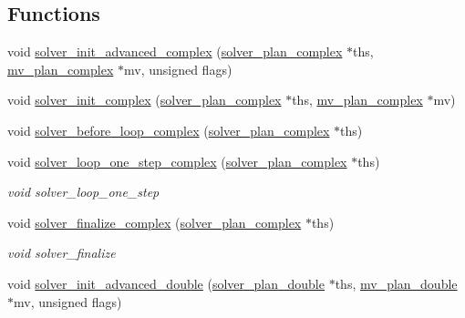 \subsection*{Functions}
\begin{CompactItemize}
\item 
\hypertarget{group__solver_gdc8907c56239059e1d313b9aa93bc710}{
void \hyperlink{group__solver_gdc8907c56239059e1d313b9aa93bc710}{solver\_\-init\_\-advanced\_\-complex} (\hyperlink{structsolver__plan__complex}{solver\_\-plan\_\-complex} $\ast$ths, \hyperlink{structmv__plan__complex}{mv\_\-plan\_\-complex} $\ast$mv, unsigned flags)}
\label{group__solver_gdc8907c56239059e1d313b9aa93bc710}

\item 
\hypertarget{group__solver_g136cee51323de9e8402a4735549c0bc5}{
void \hyperlink{group__solver_g136cee51323de9e8402a4735549c0bc5}{solver\_\-init\_\-complex} (\hyperlink{structsolver__plan__complex}{solver\_\-plan\_\-complex} $\ast$ths, \hyperlink{structmv__plan__complex}{mv\_\-plan\_\-complex} $\ast$mv)}
\label{group__solver_g136cee51323de9e8402a4735549c0bc5}

\item 
\hypertarget{group__solver_g54498806e5ab4046a2ef8fc426e5b141}{
void \hyperlink{group__solver_g54498806e5ab4046a2ef8fc426e5b141}{solver\_\-before\_\-loop\_\-complex} (\hyperlink{structsolver__plan__complex}{solver\_\-plan\_\-complex} $\ast$ths)}
\label{group__solver_g54498806e5ab4046a2ef8fc426e5b141}

\item 
\hypertarget{group__solver_g3b80b04ee3429b04c310992fb0a12420}{
void \hyperlink{group__solver_g3b80b04ee3429b04c310992fb0a12420}{solver\_\-loop\_\-one\_\-step\_\-complex} (\hyperlink{structsolver__plan__complex}{solver\_\-plan\_\-complex} $\ast$ths)}
\label{group__solver_g3b80b04ee3429b04c310992fb0a12420}

\begin{CompactList}\small\item\em void solver\_\-loop\_\-one\_\-step \item\end{CompactList}\item 
\hypertarget{group__solver_g2f44c78734390e47d72578f4c9cbe709}{
void \hyperlink{group__solver_g2f44c78734390e47d72578f4c9cbe709}{solver\_\-finalize\_\-complex} (\hyperlink{structsolver__plan__complex}{solver\_\-plan\_\-complex} $\ast$ths)}
\label{group__solver_g2f44c78734390e47d72578f4c9cbe709}

\begin{CompactList}\small\item\em void solver\_\-finalize \item\end{CompactList}\item 
\hypertarget{group__solver_g86bbf9d33b307eab191be8f7d30326ac}{
void \hyperlink{group__solver_g86bbf9d33b307eab191be8f7d30326ac}{solver\_\-init\_\-advanced\_\-double} (\hyperlink{structsolver__plan__double}{solver\_\-plan\_\-double} $\ast$ths, \hyperlink{structmv__plan__double}{mv\_\-plan\_\-double} $\ast$mv, unsigned flags)}
\label{group__solver_g86bbf9d33b307eab191be8f7d30326ac}


\end{CompactItemize}
